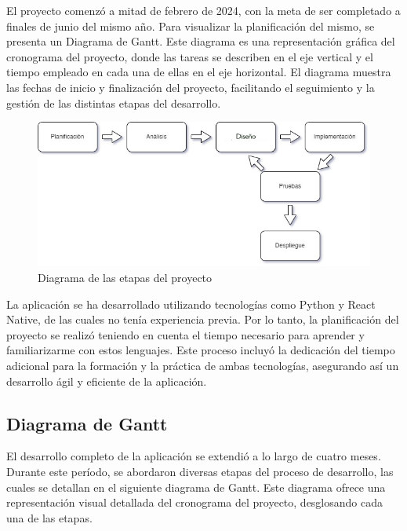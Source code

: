 El proyecto comenzó a mitad de febrero de 2024, con la meta de ser completado a finales de junio del mismo año. Para visualizar la planificación del mismo, se presenta un Diagrama de Gantt. Este diagrama es una representación gráfica del cronograma del proyecto, donde las tareas se describen en el  eje vertical y el tiempo empleado en cada una de ellas en el eje horizontal. El diagrama muestra las fechas de inicio y finalización del proyecto, facilitando el seguimiento y la gestión de las distintas etapas del desarrollo.
\vspace{0.5cm}
\begin{figure}[H]
    \centering
    \includegraphics[width=1\textwidth]{imagenes/DiagramaEtapas.jpg}
    \caption{Diagrama de las etapas del proyecto}
    \label{fig:diagrama_etapas}
\end{figure}


La aplicación se ha desarrollado utilizando tecnologías como Python y React Native, de las cuales no tenía experiencia previa. Por lo tanto, la planificación del proyecto se realizó teniendo en cuenta el tiempo necesario para aprender y familiarizarme con estos lenguajes. Este proceso incluyó la dedicación del tiempo adicional para la formación y la práctica de ambas tecnologías, asegurando así un desarrollo ágil y eficiente de la aplicación.

\subsection{Diagrama de Gantt}

El desarrollo completo de la aplicación se extendió a lo largo de cuatro meses. Durante este período, se abordaron diversas etapas del proceso de desarrollo, las cuales se detallan en el siguiente diagrama de Gantt. Este diagrama ofrece una representación visual detallada del cronograma del proyecto, desglosando cada una de las etapas.

